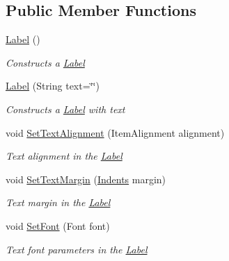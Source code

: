 \subsection*{Public Member Functions}
\begin{DoxyCompactItemize}
\item 
\mbox{\hyperlink{class_space_v_i_l_1_1_label_aac85dea14968f4b4b68767e9a5138e92}{Label}} ()
\begin{DoxyCompactList}\small\item\em Constructs a \mbox{\hyperlink{class_space_v_i_l_1_1_label}{Label}} \end{DoxyCompactList}\item 
\mbox{\hyperlink{class_space_v_i_l_1_1_label_a6b91b2ddcbc0d66e667d6a15abaa2493}{Label}} (String text=\char`\"{}\char`\"{})
\begin{DoxyCompactList}\small\item\em Constructs a \mbox{\hyperlink{class_space_v_i_l_1_1_label}{Label}} with text \end{DoxyCompactList}\item 
void \mbox{\hyperlink{class_space_v_i_l_1_1_label_a0f5fc3700bd8979d9760bd8ba424db04}{Set\+Text\+Alignment}} (Item\+Alignment alignment)
\begin{DoxyCompactList}\small\item\em Text alignment in the \mbox{\hyperlink{class_space_v_i_l_1_1_label}{Label}} \end{DoxyCompactList}\item 
void \mbox{\hyperlink{class_space_v_i_l_1_1_label_ada348a70497547222a0f5d43d0e8b401}{Set\+Text\+Margin}} (\mbox{\hyperlink{struct_space_v_i_l_1_1_decorations_1_1_indents}{Indents}} margin)
\begin{DoxyCompactList}\small\item\em Text margin in the \mbox{\hyperlink{class_space_v_i_l_1_1_label}{Label}} \end{DoxyCompactList}\item 
void \mbox{\hyperlink{class_space_v_i_l_1_1_label_ae14fde68f34a632420535f72b8f92d86}{Set\+Font}} (Font font)
\begin{DoxyCompactList}\small\item\em Text font parameters in the \mbox{\hyperlink{class_space_v_i_l_1_1_label}{Label}} \end{DoxyCompactList}\item 
\mbox{\label{class_space_v_i_l_1_1_label_a9ec22471d3fe3e1e9d7d38cbe6d29c35}} 

\end{DoxyCompactItemize}
